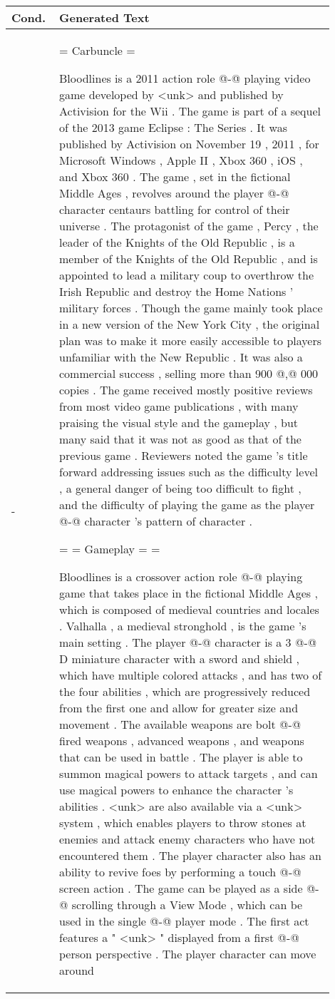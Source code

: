 \documentclass[11pt]{article}
\begin{document}
\begin{table*}[h]
    \centering
    \begin{tabular}{p{0.1\linewidth} | p{0.8\linewidth}}
    \hline
        Cond. & Generated Text  \\
        \hline
         - & {\tiny = Carbuncle = 
 
 Bloodlines is a 2011 action role @-@ playing video game developed by <unk> and published by Activision for the Wii . The game is part of a sequel of the 2013 game Eclipse : The Series . It was published by Activision on November 19 , 2011 , for Microsoft Windows , Apple II , Xbox 360 , iOS , and Xbox 360 . 
 The game , set in the fictional Middle Ages , revolves around the player @-@ character centaurs battling for control of their universe . The protagonist of the game , Percy , the leader of the Knights of the Old Republic , is a member of the Knights of the Old Republic , and is appointed to lead a military coup to overthrow the Irish Republic and destroy the Home Nations ' military forces . Though the game mainly took place in a new version of the New York City , the original plan was to make it more easily accessible to players unfamiliar with the New Republic . It was also a commercial success , selling more than 900 @,@ 000 copies . 
 The game received mostly positive reviews from most video game publications , with many praising the visual style and the gameplay , but many said that it was not as good as that of the previous game . Reviewers noted the game 's title forward addressing issues such as the difficulty level , a general danger of being too difficult to fight , and the difficulty of playing the game as the player @-@ character 's pattern of character . 
 
 = = Gameplay = = 
 
 Bloodlines is a crossover action role @-@ playing game that takes place in the fictional Middle Ages , which is composed of medieval countries and locales . Valhalla , a medieval stronghold , is the game 's main setting . The player @-@ character is a 3 @-@ D miniature character with a sword and shield , which have multiple colored attacks , and has two of the four abilities , which are progressively reduced from the first one and allow for greater size and movement . The available weapons are bolt @-@ fired weapons , advanced weapons , and weapons that can be used in battle . The player is able to summon magical powers to attack targets , and can use magical powers to enhance the character 's abilities . <unk> are also available via a <unk> system , which enables players to throw stones at enemies and attack enemy characters who have not encountered them . The player character also has an ability to revive foes by performing a touch @-@ screen action . 
 The game can be played as a side @-@ scrolling through a View Mode , which can be used in the single @-@ player mode . The first act features a " <unk> " displayed from a first @-@ person perspective . The player character can move around
 
}
\end{tabular}
\end{table*}
\end{document}
